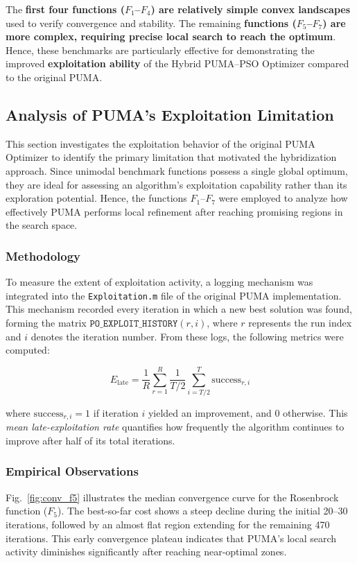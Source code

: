 \documentclass[a4paper,12pt]{article}
\begin{document}
\bigskip

The \textbf{first four functions ($F_1$--$F_4$) are relatively simple convex landscapes} used to verify convergence and stability.  
The remaining \textbf{functions ($F_5$--$F_7$) are more complex, requiring precise local search to reach the optimum}.  
Hence, these benchmarks are particularly effective for demonstrating the improved \textbf{exploitation ability} of the Hybrid PUMA--PSO Optimizer compared to the original PUMA.

\subsection{Analysis of PUMA’s Exploitation Limitation}

This section investigates the exploitation behavior of the original PUMA Optimizer to identify the primary limitation that motivated the hybridization approach.  
Since unimodal benchmark functions possess a single global optimum, they are ideal for assessing an algorithm’s exploitation capability rather than its exploration potential.  
Hence, the functions $F_1$--$F_7$ were employed to analyze how effectively PUMA performs local refinement after reaching promising regions in the search space.

\subsubsection{Methodology}
To measure the extent of exploitation activity, a logging mechanism was integrated into the \texttt{Exploitation.m} file of the original PUMA implementation.  
This mechanism recorded every iteration in which a new best solution was found, forming the matrix $\texttt{PO\_EXPLOIT\_HISTORY}(r,i)$, where $r$ represents the run index and $i$ denotes the iteration number.  
From these logs, the following metrics were computed:

\begin{equation}
E_{\text{late}} = \frac{1}{R}\sum_{r=1}^{R} 
\frac{1}{T/2}\sum_{i=T/2}^{T}\text{success}_{r,i}
\end{equation}

where $\text{success}_{r,i}=1$ if iteration $i$ yielded an improvement, and $0$ otherwise.  
This \textit{mean late-exploitation rate} quantifies how frequently the algorithm continues to improve after half of its total iterations.

\subsubsection{Empirical Observations}
Fig.~\ref{fig:conv_f5} illustrates the median convergence curve for the Rosenbrock function ($F_5$).  
The best-so-far cost shows a steep decline during the initial 20--30 iterations, followed by an almost flat region extending for the remaining 470 iterations.  
This early convergence plateau indicates that PUMA’s local search activity diminishes significantly after reaching near-optimal zones.
\end{document}
